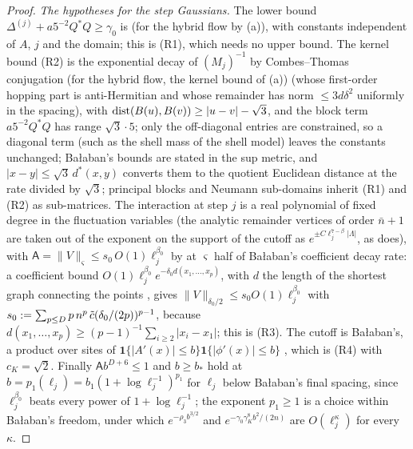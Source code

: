 \begin{proof}
\emph{The hypotheses for the step Gaussians.} The lower bound $\Delta^{(j)}+a5^{-2}Q^*Q\ge\gamma_0$ is \cite[(2.33)]{Ba1} (for the hybrid flow by (a)), with constants independent of $A$, $j$ and the domain; this is (R1), which needs no upper bound. The kernel bound (R2) is the exponential decay of $(M_j)^{-1}$ by Combes--Thomas conjugation (for the hybrid flow, the kernel bound of (a)) (whose first-order hopping part is anti-Hermitian and whose remainder has norm $\le3d\delta^2$ uniformly in the spacing), with $\operatorname{dist}(B(u),B(v))\ge|u-v|-\sqrt3$, and the block term $a5^{-2}Q^*Q$ has range $\sqrt3\cdot5$; only the off-diagonal entries are constrained, so a diagonal term (such as the shell mass of the shell model) leaves the constants unchanged; Ba{\l}aban's bounds are stated in the sup metric, and $|x-y|\le\sqrt3\,d^*(x,y)$ converts them to the quotient Euclidean distance at the rate divided by $\sqrt3$; principal blocks and Neumann sub-domains inherit (R1) and (R2) as sub-matrices. The interaction at step $j$ is a real polynomial of fixed degree in the fluctuation variables (the analytic remainder vertices of order $\bar n+1$ are taken out of the exponent on the support of the cutoff as $e^{\pm C\ell_j^{7-\beta}|\Lambda|}$, as \cite[(2.31)]{Ba2} does), with $\mathsf A=\|V\|_\varsigma\le s_0\,O(1)\ell_j^{\beta_0}$ by  at $\varsigma$ half of Ba{\l}aban's coefficient decay rate: a coefficient bound $O(1)\ell_j^{\beta_0}e^{-\delta_0d(x_1,\dots,x_p)}$, with $d$ the length of the shortest graph connecting the points \cite[(3.58)]{Ba1}, gives $\|V\|_{\delta_0/2}\le s_0O(1)\ell_j^{\beta_0}$ with $s_0:=\sum_{p\le D}p\,n^p\,\tilde c(\delta_0/(2p))^{p-1}$, because $d(x_1,\dots,x_p)\ge(p-1)^{-1}\sum_{i\ge2}|x_i-x_1|$; this is (R3). The cutoff is Ba{\l}aban's, a product over sites of $\mathbf 1\{|A'(x)|\le b\}\mathbf 1\{|\phi'(x)|\le b\}$ \cite[(3.43), (3.50)]{Ba1}, which is (R4) with $c_K=\sqrt2$. Finally $\mathsf Ab^{D+6}\le1$ and $b\ge b_*$ hold at $b=p_1(\ell_j)=b_1(1+\log\ell_j^{-1})^{p_1}$ for $\ell_j$ below Ba{\l}aban's final spacing, since $\ell_j^{\beta_0}$ beats every power of $1+\log\ell_j^{-1}$; the exponent $p_1\ge1$ is a choice within Ba{\l}aban's freedom, under which $e^{-\rho_3b^{3/2}}$ and $e^{-\gamma_0\gamma_K^8b^2/(2n)}$ are $O(\ell_j^{\kappa})$ for every $\kappa$.


\end{proof}
